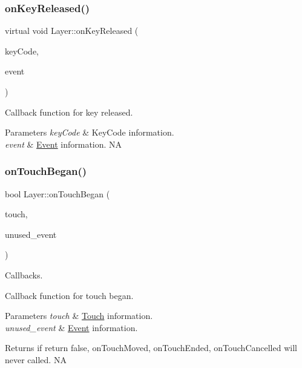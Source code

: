 \subsubsection{\texorpdfstring{on\+Key\+Released()}{onKeyReleased()}\hspace{0.1cm}{\footnotesize\ttfamily [2/2]}}
{\footnotesize\ttfamily virtual void Layer\+::on\+Key\+Released (\begin{DoxyParamCaption}\item[{\hyperlink{classEventKeyboard_a7cd3fa46515673276ce8ec7f0e051606}{Event\+Keyboard\+::\+Key\+Code}}]{key\+Code,  }\item[{\hyperlink{classEvent}{Event} $\ast$}]{event }\end{DoxyParamCaption})\hspace{0.3cm}{\ttfamily [virtual]}}

Callback function for key released. 
\begin{DoxyParams}{Parameters}
{\em key\+Code} & Key\+Code information. \\
\hline
{\em event} & \hyperlink{classEvent}{Event} information.  NA \\
\hline
\end{DoxyParams}
\mbox{\label{classLayer_abe632dc131bdeb3d603090d4d31db25c}} 
\subsubsection{\texorpdfstring{on\+Touch\+Began()}{onTouchBegan()}\hspace{0.1cm}{\footnotesize\ttfamily [1/2]}}
{\footnotesize\ttfamily bool Layer\+::on\+Touch\+Began (\begin{DoxyParamCaption}\item[{\hyperlink{classTouch}{Touch} $\ast$}]{touch,  }\item[{\hyperlink{classEvent}{Event} $\ast$}]{unused\+\_\+event }\end{DoxyParamCaption})\hspace{0.3cm}{\ttfamily [virtual]}}



Callbacks. 

Callback function for touch began.


\begin{DoxyParams}{Parameters}
{\em touch} & \hyperlink{classTouch}{Touch} information. \\
\hline
{\em unused\+\_\+event} & \hyperlink{classEvent}{Event} information. \\
\hline
\end{DoxyParams}
\begin{DoxyReturn}{Returns}
if return false, on\+Touch\+Moved, on\+Touch\+Ended, on\+Touch\+Cancelled will never called.  NA 
\end{DoxyReturn}


